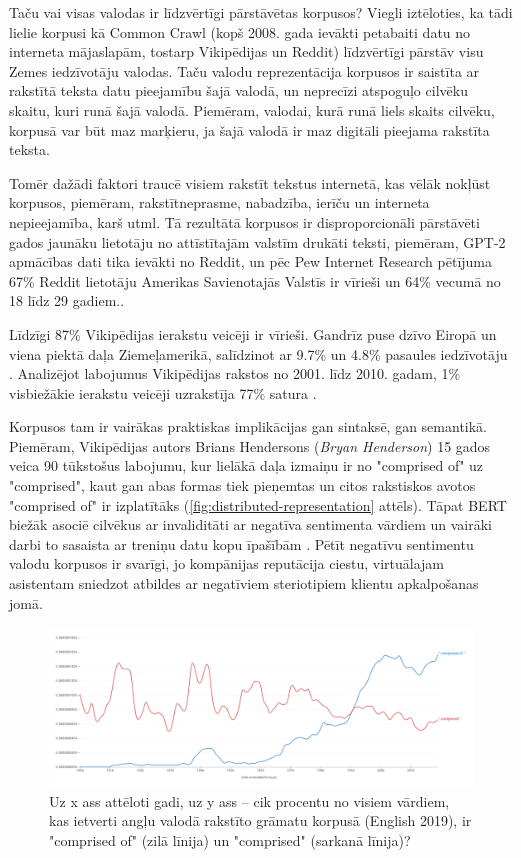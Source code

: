 Taču vai visas valodas ir līdzvērtīgi pārstāvētas korpusos? Viegli iztēloties, ka tādi lielie korpusi kā Common Crawl (kopš 2008. gada ievākti petabaiti datu no interneta mājaslapām, tostarp Vikipēdijas un Reddit) līdzvērtīgi pārstāv visu Zemes iedzīvotāju valodas. Taču valodu reprezentācija korpusos ir saistīta ar rakstītā teksta datu pieejamību šajā valodā, un neprecīzi atspoguļo cilvēku skaitu, kuri runā šajā valodā. Piemēram, valodai, kurā runā liels skaits cilvēku, korpusā var būt maz marķieru, ja šajā valodā ir maz digitāli pieejama rakstīta teksta.

Tomēr dažādi faktori traucē visiem rakstīt tekstus internetā, kas vēlāk nokļūst korpusos, piemēram, rakstītneprasme, nabadzība, ierīču un interneta nepieejamība, karš utml. Tā rezultātā korpusos ir disproporcionāli pārstāvēti gados jaunāku lietotāju no attīstītajām valstīm drukāti teksti, piemēram, GPT-2 apmācības dati tika ievākti no Reddit, un pēc Pew Internet Research pētījuma 67\% Reddit lietotāju Amerikas Savienotajās Valstīs ir vīrieši un 64\% vecumā no 18 līdz 29 gadiem.\cite{bender2021}.

Līdzīgi 87\% Vikipēdijas ierakstu veicēji ir vīrieši. Gandrīz puse dzīvo Eiropā un viena piektā daļa Ziemeļamerikā, salīdzinot ar 9.7\% un 4.8\% pasaules iedzīvotāju \cite{wikimedia2020}. Analizējot labojumus Vikipēdijas rakstos no 2001. līdz 2010. gadam, 1\% visbiežākie ierakstu veicēji uzrakstīja 77\% satura \cite{1percent}.

Korpusos tam ir vairākas praktiskas implikācijas gan sintaksē, gan semantikā. Piemēram, Vikipēdijas autors Brians Hendersons (\textit{Bryan Henderson}) 15 gados veica 90 tūkstošus labojumu, kur lielākā daļa izmaiņu ir no "comprised of" uz "comprised", kaut gan abas formas tiek pieņemtas un citos rakstiskos avotos "comprised of" ir izplatītāks (\ref{fig:distributed-representation} attēls). Tāpat BERT biežāk asociē cilvēkus ar invaliditāti ar negatīva sentimenta vārdiem un vairāki darbi to sasaista ar treniņu datu kopu īpašībām \cite{bender2021}. Pētīt negatīvu sentimentu valodu korpusos ir svarīgi, jo kompānijas reputācija ciestu, virtuālajam asistentam sniedzot atbildes ar negatīviem steriotipiem klientu apkalpošanas jomā.


\begin{figure}[h]
    \centering
    \includegraphics[width=\textwidth]{figures/comprised.png}
    \caption{Uz x ass attēloti gadi, uz y ass -- cik procentu no visiem vārdiem, kas ietverti angļu valodā rakstīto grāmatu korpusā (English 2019), ir "comprised of" (zilā līnija) un "comprised" (sarkanā līnija)? \cite{ngram-viewer}}
    \label{fig:comprised}
\end{figure}

